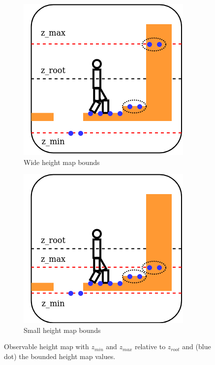 \begin{figure}
    \captionsetup[subfigure]{justification=centering}
    \begin{subfigure}[t]{.49\linewidth}
    \includegraphics[width=\textwidth]{Figures/Chapter_LEAS/hm_bounded_high.png}
    \caption{Wide height map bounds}
    \end{subfigure}
    \begin{subfigure}[t]{.49\linewidth}
    \includegraphics[width=\textwidth]{Figures/Chapter_LEAS/hm_bounded_low.png}
    \caption{Small height map bounds}
    \end{subfigure}
    \caption{Observable height map with $z_{min}$ and  $z_{max}$ relative to $z_{root}$ and (blue dot) the bounded height map values.}
    \label{fig:height map_bounds}
\end{figure}

